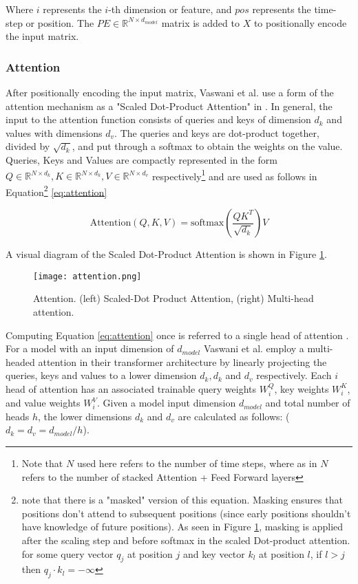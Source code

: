 Where $i$ represents the $i$-th dimension or feature, and $pos$ represents the time-step or position. The $PE \in \mathbb{R}^{N \times d_{model}}$ matrix is added to $X$ to positionally encode the input matrix. 

\subsubsection{Attention}
After positionally encoding the input matrix, Vaswani et al. use a form of the attention mechanism as a "Scaled Dot-Product Attention" in \cite{vaswaniAttentionAllYou2023}. In general, the input to the attention function consists of queries and keys of dimension $d_k$ and values with dimensions $d_v$. The queries and keys are dot-product together, divided by $\sqrt{d_k}$, and put through a softmax to obtain the weights on the value. Queries, Keys and Values are compactly represented in the form $Q \in \mathbb{R}^{N \times d_k},K \in \mathbb{R}^{N \times d_k},V \in \mathbb{R}^{N \times d_v}$ respectively\footnote{Note that $N$ used here refers to the number of time steps, where as in \cite{vaswaniAttentionAllYou2023} $N$ refers to the number of stacked Attention + Feed Forward layers} and are used as follows in Equation\footnote{note that there is a "masked" version of this equation. Masking ensures that positions don't attend to subsequent positions (since early positions shouldn't have knowledge of future positions). As seen in Figure \ref{fig:attention}, masking is applied after the scaling step and before softmax in the scaled Dot-product attention. for some query vector $q_j$ at position $j$ and key vector $k_l$ at position $l$, if $l > j$ then $q_j \cdot k_l = -\infty$} \ref{eq:attention}

\begin{equation}
    \label{eq:attention}
    \text{Attention}(Q,K,V) = \text{softmax}\left(\frac{QK^T}{\sqrt{d_k}}\right)V
\end{equation}

A visual diagram of the Scaled Dot-Product Attention is shown in Figure \ref{fig:attention}.

\begin{figure}[ht]
    \centering
    \texttt{[image: attention.png]}
    \caption{Attention. (left) Scaled-Dot Product Attention, (right) Multi-head attention. \cite{vaswaniAttentionAllYou2023}}
    \label{fig:attention}
\end{figure}

Computing Equation \ref{eq:attention} once is referred to a single head of attention \cite{vaswaniAttentionAllYou2023}. For a model with an input dimension of $d_{model}$ Vaswani et al. employ a multi-headed attention in their transformer architecture by linearly projecting the queries, keys and values to a lower dimension $d_k, d_k$ and $d_v$ respectively. Each $i$ head of attention has an associated trainable query weights $W^Q_i$, key weights $W^K_i$, and value weights $W^V_i$. Given a model input dimension $d_{model}$ and total number of heads $h$, the lower dimensions $d_k$ and $d_v$ are calculated as follows: ($d_k = d_v = d_{model}/h$). 

